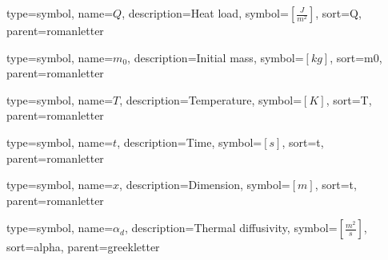 {
type=symbol, %
name={\ensuremath{Q}}, %
description={Heat load}, %
symbol={$\left[\frac{J}{m^2} \right]$}, %
sort=Q, %
parent=romanletter %
}

{
type=symbol, %
name={\ensuremath{m_0}}, %
description={Initial mass}, %
symbol={$\left[kg \right]$}, %
sort=m0, %
parent=romanletter %
}


{
	type=symbol, %
	name={\ensuremath{T}}, %
	description={Temperature}, %
	symbol={$\left[K\right]$}, %
	sort=T, %
	parent=romanletter %
}

{
	type=symbol, %
	name={\ensuremath{t}}, %
	description={Time}, %
	symbol={$\left[s\right]$}, %
	sort=t, %
	parent=romanletter %
}

{
	type=symbol, %
	name={\ensuremath{x}}, %
	description={Dimension}, %
	symbol={$\left[m\right]$}, %
	sort=t, %
	parent=romanletter %
}

{
	type=symbol, %
	name={\ensuremath{\alpha_d}}, %
	description={Thermal diffusivity}, %
	symbol={$\left[\frac{m^2}{s}\right]$}, %
	sort=alpha, %
	parent=greekletter %
}

